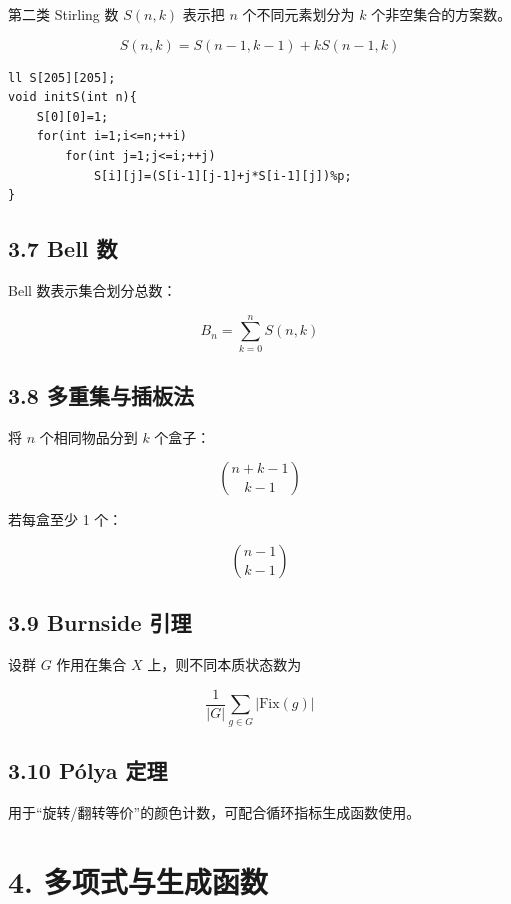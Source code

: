 \documentclass[UTF8,a4paper,11pt]{ctexart}
\begin{document}
第二类 Stirling 数 $S(n,k)$ 表示把 $n$ 个不同元素划分为 $k$ 个非空集合的方案数。

\[
S(n,k)=S(n-1,k-1)+kS(n-1,k)
\]

\begin{Verbatim}[fontsize=\small,frame=single,breaklines=true,breakanywhere=true]
ll S[205][205];
void initS(int n){
    S[0][0]=1;
    for(int i=1;i<=n;++i)
        for(int j=1;j<=i;++j)
            S[i][j]=(S[i-1][j-1]+j*S[i-1][j])%p;
}
\end{Verbatim}

\subsection*{3.7 Bell 数}

Bell 数表示集合划分总数：

\[
B_n=\sum_{k=0}^n S(n,k)
\]

\subsection*{3.8 多重集与插板法}

将 $n$ 个相同物品分到 $k$ 个盒子：

\[
\binom{n+k-1}{k-1}
\]

若每盒至少 1 个：

\[
\binom{n-1}{k-1}
\]

\subsection*{3.9 Burnside 引理}

设群 $G$ 作用在集合 $X$ 上，则不同本质状态数为

\[
\frac{1}{|G|}\sum_{g\in G}|\mathrm{Fix}(g)|
\]

\subsection*{3.10 Pólya 定理}

用于“旋转/翻转等价”的颜色计数，可配合循环指标生成函数使用。


\section*{4. 多项式与生成函数}
\end{document}
